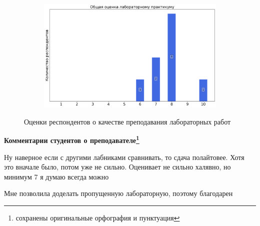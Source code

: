 \begin{figure}[H]
\begin{subfigure}[b]{0.45\textwidth}
            \end{subfigure}
            \begin{subfigure}[b]{0.45\textwidth}
                \centering
                \includegraphics[width=\textwidth]{images/1 course/Общая физика - механика/labniks-marks-Удалова А.Г.-3.png}
            \end{subfigure}	
            \caption{Оценки респондентов о качестве преподавания лабораторных работ}
        \end{figure}

        \textbf{Комментарии студентов о преподавателе\protect\footnote{сохранены оригинальные орфография и пунктуация}}
            \begin{commentbox} 
                Ну наверное если с другими лабниками сравнивать, то сдача полайтовее. Хотя это вначале было, потом уже не сильно. Оценивает не сильно халявно, но минимум 7 я думаю всегда можно 
            \end{commentbox} 
        
            \begin{commentbox} 
                Мне позволила доделать пропущенную лабораторную, поэтому благодарен 
            \end{commentbox}


